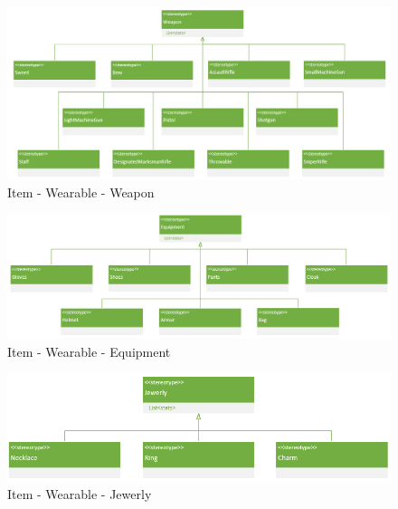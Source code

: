 \newpage
\begin{figure}[H]
    \begin{center}
    \includegraphics[width=\linewidth]{10_img/Z_annexeA/item_wearable_weapon.PNG}
    \caption{Item - Wearable - Weapon}
    \label{A-Weapon}
    \end{center}
\end{figure}

\begin{figure}[H]
    \begin{center}
    \includegraphics[width=\linewidth]{10_img/Z_annexeA/item_wearable_equipment.PNG}
    \caption{Item - Wearable - Equipment}
    \label{A-Equipment}
    \end{center}
\end{figure}

\begin{figure}[H]
    \begin{center}
    \includegraphics[width=14cm]{10_img/Z_annexeA/item_wearable_jewerly.PNG}
    \caption{Item - Wearable - Jewerly}
    \label{A-Jewerly}
    \end{center}
\end{figure}

